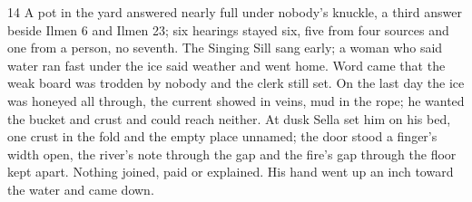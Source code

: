 \begin{CRchronicle}{14}
A pot in the yard answered nearly full under nobody’s knuckle, a third answer beside Ilmen 6 and Ilmen 23; six hearings stayed six, five from four sources and one from a person, no seventh. The Singing Sill sang early; a woman who said water ran fast under the ice said weather and went home. Word came that the weak board was trodden by nobody and the clerk still set. On the last day the ice was honeyed all through, the current showed in veins, mud in the rope; he wanted the bucket and crust and could reach neither. At dusk Sella set him on his bed, one crust in the fold and the empty place unnamed; the door stood a finger’s width open, the river’s note through the gap and the fire’s gap through the floor kept apart. Nothing joined, paid or explained. His hand went up an inch toward the water and came down.
\end{CRchronicle}

